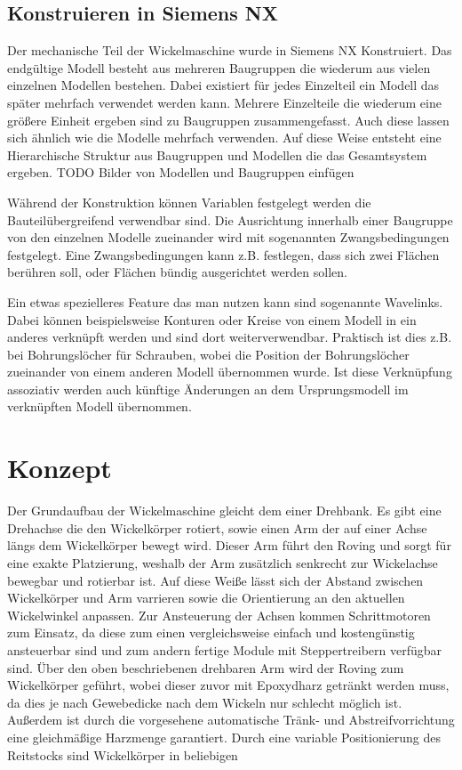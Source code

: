 \documentclass[12pt, a4paper, ngerman]{article}
\begin{document}
\subsection{Konstruieren in Siemens NX}
Der mechanische Teil der Wickelmaschine wurde in Siemens NX Konstruiert. Das endgültige Modell besteht aus mehreren Baugruppen die wiederum aus vielen einzelnen Modellen bestehen. Dabei existiert für jedes Einzelteil ein Modell das später mehrfach verwendet werden kann.  Mehrere Einzelteile die wiederum eine größere Einheit ergeben sind zu Baugruppen zusammengefasst. Auch diese lassen sich ähnlich wie die Modelle mehrfach verwenden. Auf diese Weise entsteht eine Hierarchische Struktur aus Baugruppen und Modellen die das Gesamtsystem ergeben. TODO Bilder von Modellen und Baugruppen einfügen

Während der Konstruktion können Variablen festgelegt werden die Bauteilübergreifend verwendbar sind. Die Ausrichtung innerhalb einer Baugruppe von den einzelnen Modelle zueinander wird mit sogenannten Zwangsbedingungen festgelegt. Eine Zwangsbedingungen kann z.B. festlegen, dass sich zwei Flächen berühren soll, oder Flächen bündig ausgerichtet werden sollen. 

Ein etwas spezielleres Feature das man nutzen kann sind sogenannte Wavelinks. Dabei können beispielsweise Konturen oder Kreise von einem Modell in ein anderes verknüpft werden und sind dort weiterverwendbar. Praktisch ist dies z.B. bei Bohrungslöcher für Schrauben, wobei die Position der Bohrungslöcher zueinander von einem anderen Modell übernommen wurde. Ist diese Verknüpfung assoziativ werden auch künftige Änderungen an dem Ursprungsmodell im verknüpften Modell übernommen.
    
\section{Konzept}
Der Grundaufbau der Wickelmaschine gleicht dem einer Drehbank. Es gibt eine Drehachse die den Wickelkörper rotiert, sowie einen Arm der auf einer Achse längs dem Wickelkörper bewegt wird. Dieser Arm führt den Roving und sorgt für eine exakte Platzierung, weshalb der Arm zusätzlich senkrecht zur Wickelachse bewegbar und rotierbar ist. Auf diese Weiße lässt sich der Abstand zwischen Wickelkörper und Arm varrieren sowie die Orientierung an den aktuellen Wickelwinkel anpassen. Zur Ansteuerung der Achsen kommen Schrittmotoren zum Einsatz, da diese zum einen vergleichsweise einfach und kostengünstig ansteuerbar sind und zum andern fertige Module mit Steppertreibern verfügbar sind. Über den oben beschriebenen drehbaren Arm wird der Roving zum Wickelkörper geführt, wobei dieser zuvor mit Epoxydharz getränkt werden muss, da dies je nach Gewebedicke nach dem Wickeln nur schlecht möglich ist. Außerdem ist durch die vorgesehene automatische Tränk- und Abstreifvorrichtung eine gleichmäßige Harzmenge garantiert. Durch eine variable Positionierung des Reitstocks sind Wickelkörper in beliebigen 
\end{document}
